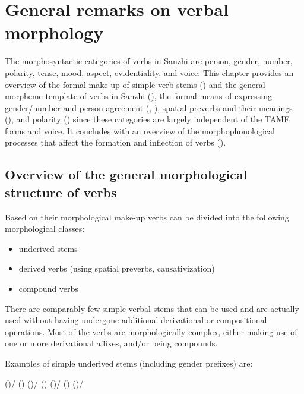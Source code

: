\chapter{General remarks on verbal morphology}
\label{cpt:verbs}

The morphosyntactic categories of verbs in Sanzhi are person, gender, number, polarity, tense, mood, aspect, evidentiality, and voice. This chapter provides an overview of the formal make-up of simple verb stems () and the general morpheme template of verbs in Sanzhi (), the formal means of expressing gender/number and person agreement (, ), spatial preverbs and their meanings (), and polarity () since these categories are largely independent of the TAME forms and voice. It concludes with an overview of the morphophonological processes that affect the formation and inflection of verbs ().



\section{Overview of the general morphological structure of verbs}
\label{sec:Overview about the general morphological structure of verbs}

Based on their morphological make-up verbs can be divided into the following morphological classes:
%
\begin{itemize}
	\item	underived stems
	\item	derived verbs (using spatial preverbs, causativization)
	\item	compound verbs
\end{itemize}

There are comparably few simple verbal stems that can be used and are actually used without having undergone additional derivational or compositional operations. Most of the verbs are morphologically complex, either making use of one or more derivational affixes, and/or being compounds.

Examples of simple underived stems (including gender prefixes) are:
%
\begin{exe}
	\ex	\label{ex:underived verbs verbs}
	\begin{xlist}
		\ex	 {} ()\slash{} () 
		\ex	{} ()\slash{} () 
		\ex	{} 
		\ex	{} ()\slash{} () 
		\ex	{} ()\slash{} 
	\end{xlist}
\end{exe}

